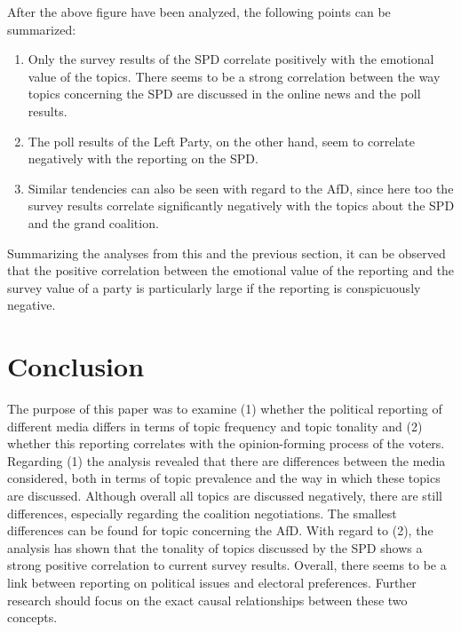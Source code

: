 \documentclass[12pt,a4paper,notitlepage]{article}
\begin{document}
After the above figure have been analyzed, the following points can be summarized:

\begin{enumerate}
	\item Only the survey results of the SPD correlate positively with the emotional value of the topics. There seems to be a strong correlation between the way topics concerning the SPD are discussed in the online news and the poll results.  
	\item The poll results of the Left Party, on the other hand, seem to correlate negatively with the reporting on the SPD. 
	\item Similar tendencies can also be seen with regard to the AfD, since here too the survey results correlate significantly negatively with the topics about the SPD and the grand coalition. 
\end{enumerate} 

Summarizing the analyses from this and the previous section, it can be observed that the positive correlation between the emotional value of the reporting and the survey value of a party is particularly large if the reporting is conspicuously negative. 

\section{Conclusion}

The purpose of this paper was to examine (1) whether the political reporting of different media differs in terms of topic frequency and topic tonality and (2) whether this reporting correlates with the opinion-forming process of the voters. Regarding (1) the analysis revealed that there are differences between the media considered, both in terms of topic prevalence and the way in which these topics are discussed. Although overall all topics are discussed negatively, there are still differences, especially regarding the coalition negotiations. The smallest differences can be found for topic concerning the AfD. With regard to (2), the analysis has shown that the tonality of topics discussed by the SPD shows a strong positive correlation to current survey results. Overall, there seems to be a link between reporting on political issues and electoral preferences. Further research should focus on the exact causal relationships between these two concepts. 

\pagebreak

\printbibliography

\appendix
\end{document}
